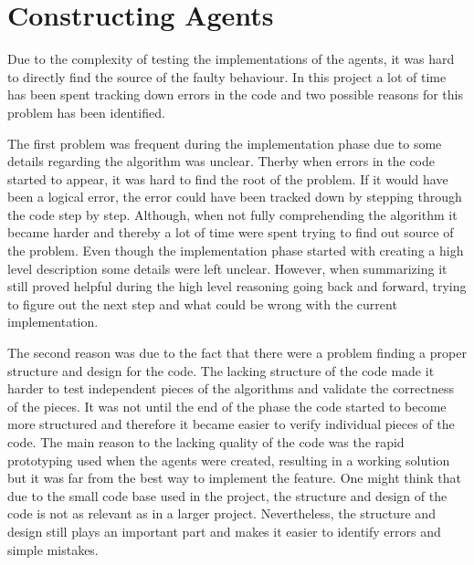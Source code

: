 \section{Constructing Agents}
\label{ap:constructing_experiments}
Due to the complexity of testing the implementations of the agents, it was hard to directly find the source of the faulty behaviour. In this project a lot of time has been spent tracking down errors in the code and two possible reasons for this problem has been identified.

The first problem was frequent during the implementation phase due to some details regarding the algorithm was unclear. Therby when errors in the code started to appear, it was hard to find the root of the problem. If it would have been a logical error, the error could have been tracked down by stepping through the code step by step. Although, when not fully comprehending the algorithm it became harder and thereby a lot of time were spent trying to find out source of the problem. Even though the implementation phase started with creating a high level description some details were left unclear. However, when summarizing it still proved helpful during the high level reasoning going back and forward, trying to figure out the next step and what could be wrong with the current implementation.

The second reason was due to the fact that there were a problem finding a proper structure and design for the code. The lacking structure of the code made it harder to test independent pieces of the algorithms and validate the correctness of the pieces. It was not until the end of the phase the code started to become more structured and therefore it became easier to verify individual pieces of the code. The main reason to the lacking quality of the code was the rapid prototyping used when the agents were created, resulting in a working solution but it was far from the best way to implement the feature. One might think that due to the small code base used in the project, the structure and design of the code is not as relevant as in a larger project. Nevertheless, the structure and design still plays an important part and makes it easier to identify errors and simple mistakes.